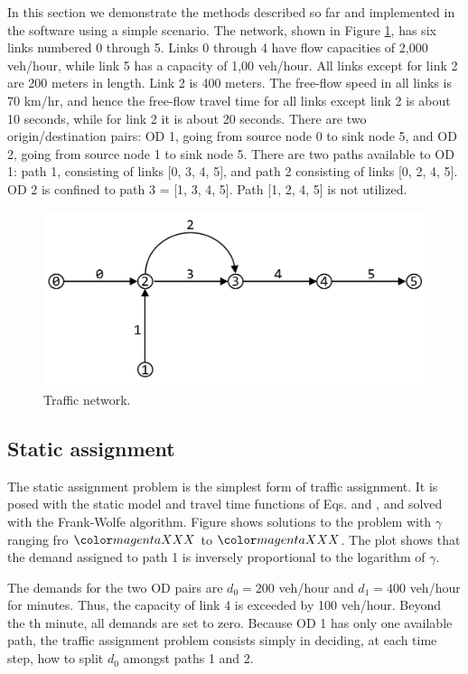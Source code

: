 In this section we demonstrate the methods described so far and implemented in the software using a simple scenario. The network, shown in Figure \ref{fig:config}, has six links numbered 0 through 5. Links 0 through 4 have flow capacities of 2,000 veh/hour, while link 5 has a capacity of 1,00 veh/hour. All links except for link 2 are 200 meters in length. Link 2 is 400 meters. The free-flow speed in all links is 70 km/hr, and hence the free-flow travel time for all links except link 2 is about 10 seconds, while for link 2 it is about 20 seconds. There are two origin/destination pairs: OD 1, going from source node 0 to sink node 5, and OD 2, going from source node 1 to sink node 5. There are two paths available to OD 1: path 1, consisting of links [0, 3, 4, 5], and path 2 consisting of links [0, 2, 4, 5]. OD 2 is confined to path 3 = [1, 3, 4, 5]. Path [1, 2, 4, 5] is not utilized.

\begin{figure}[h]
    \centering
    \includegraphics[width=\linewidth]{figs/config.png}
    \caption{Traffic network.}
    \label{fig:config}
\end{figure}

\subsection{Static assignment}
The static assignment problem is the simplest form of traffic assignment. It is posed with the static model and travel time functions of Eqs. \XXX and \XXX, and solved with the Frank-Wolfe algorithm. Figure \XXX shows solutions to the problem with $\gamma$ ranging fro $\XXX$ to $\XXX$. The plot shows that the demand assigned to path 1 is inversely proportional to the logarithm of $\gamma$. 
 
The demands for the two OD pairs are $d_0 = 200$ veh/hour and $d_1=400$ veh/hour for \XXX minutes. Thus, the capacity of link 4 is exceeded by 100 veh/hour. Beyond the \XXX th minute, all demands are set to zero. Because OD 1 has only one available path, the traffic assignment problem consists simply in deciding, at each time step, how to split $d_0$ amongst paths 1 and 2. 

